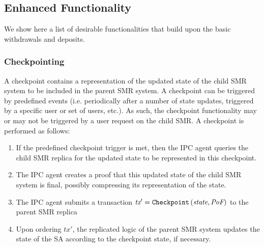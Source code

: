 \subsection{Enhanced Functionality}
\label{enhancedFunc}
We show here a list of desirable functionalities that build upon the basic withdrawals and deposits.
\subsubsection{Checkpointing} A checkpoint contains a representation of the updated state of the child SMR system to be included in the parent SMR system. A checkpoint can be triggered by predefined events (i.e. periodically after a number of state updates, triggered by a specific user or set of users, etc.). As such, the checkpoint functionality may or may not be triggered by a user request on the child SMR. A checkpoint is performed as follows: 
\begin{enumerate}
\item If the predefined checkpoint trigger is met, then the IPC agent queries the child SMR replica for the updated state to be represented in this checkpoint.
\item The IPC agent creates a proof \prf that this updated state of the child SMR system is final, possibly compressing its representation of the state.
\item The IPC agent submits a transaction $\textit{tx}'=\texttt{Checkpoint}\left(\textit{state}, \textit{PoF} \right)$ to the parent SMR replica
 \item Upon ordering $tx'$, the replicated logic of the parent SMR system updates the state of the SA according to the checkpoint state, if necessary.
\end{enumerate}

